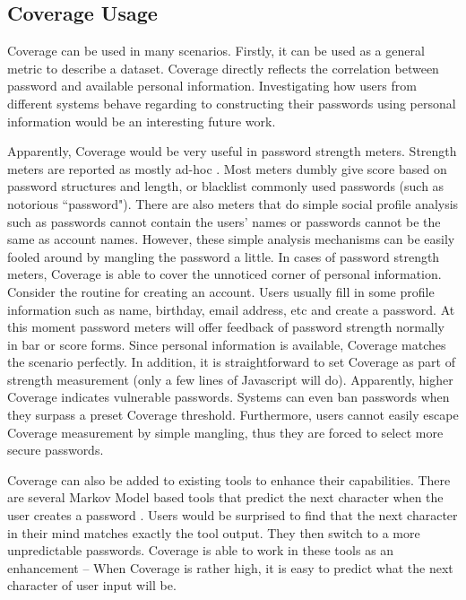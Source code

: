 \subsection{Coverage Usage}
Coverage can be used in many scenarios. Firstly, it can be used as a general metric to describe a dataset. Coverage directly reflects the correlation between password and available personal information. Investigating how users from different systems behave regarding to constructing their passwords using personal information would be an interesting future work. 

Apparently, Coverage would be very useful in password strength meters. Strength meters are reported as mostly ad-hoc \cite{de2014very}. Most meters dumbly give score based on password structures and length, or blacklist commonly used passwords (such as notorious ``password"). There are also meters that do simple social profile analysis such as passwords cannot contain the users' names or passwords cannot be the same as account names. However, these simple analysis mechanisms can be easily fooled around by mangling the password a little. In cases of password strength meters, Coverage is able to cover the unnoticed corner of personal information. Consider the routine for creating an account. Users usually fill in some profile information such as name, birthday, email address, etc and create a password. At this moment password meters will offer feedback of password strength normally in bar or score forms. Since personal information is available, Coverage matches the scenario perfectly. In addition, it is straightforward to set Coverage as part of strength measurement (only a few lines of Javascript will do). Apparently, higher Coverage indicates vulnerable passwords. Systems can even ban passwords when they surpass a preset Coverage threshold. Furthermore, users cannot easily escape Coverage measurement by simple mangling, thus they are forced to select more secure passwords.

Coverage can also be added to existing tools to enhance their capabilities. There are several Markov Model based tools that predict the next character when the user creates a password \cite{komanduri2014telepathwords}\cite{weir2010testing}. Users would be surprised to find that the next character in their mind matches exactly the tool output. They then switch to a more unpredictable passwords. Coverage is able to work in these tools as an enhancement -- When Coverage is rather high, it is easy to predict what the next character of user input will be.

